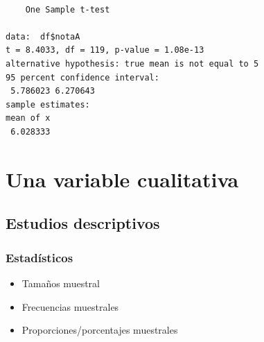 \documentclass[
  a4paper,
]{scrreport}
\newenvironment{Shaded}{\begin{snugshade}}{\end{snugshade}}
\newcommand{\AttributeTok}[1]{\textcolor[rgb]{0.40,0.45,0.13}{#1}}
\newcommand{\CommentTok}[1]{\textcolor[rgb]{0.37,0.37,0.37}{#1}}
\newcommand{\DecValTok}[1]{\textcolor[rgb]{0.68,0.00,0.00}{#1}}
\newcommand{\FunctionTok}[1]{\textcolor[rgb]{0.28,0.35,0.67}{#1}}
\newcommand{\NormalTok}[1]{\textcolor[rgb]{0.00,0.23,0.31}{#1}}
\newcommand{\SpecialCharTok}[1]{\textcolor[rgb]{0.37,0.37,0.37}{#1}}
\newcommand{\StringTok}[1]{\textcolor[rgb]{0.13,0.47,0.30}{#1}}
\providecommand{\tightlist}{%
  \setlength{\itemsep}{0pt}\setlength{\parskip}{0pt}}\usepackage{longtable,booktabs,array}
\theoremstyle{definition}
\theoremstyle{definition}
\theoremstyle{remark}
\begin{document}
\begin{Shaded}
\end{Shaded}

\begin{verbatim}

    One Sample t-test

data:  df$notaA
t = 8.4033, df = 119, p-value = 1.08e-13
alternative hypothesis: true mean is not equal to 5
95 percent confidence interval:
 5.786023 6.270643
sample estimates:
mean of x 
 6.028333 
\end{verbatim}

\hypertarget{una-variable-cualitativa}{%
\section{Una variable cualitativa}\label{una-variable-cualitativa}}

\hypertarget{estudios-descriptivos-1}{%
\subsection{Estudios descriptivos}\label{estudios-descriptivos-1}}

\hypertarget{estaduxedsticos-1}{%
\subsubsection{Estadísticos}\label{estaduxedsticos-1}}

\begin{itemize}
\tightlist
\item
  Tamaños muestral
\item
  Frecuencias muestrales
\item
  Proporciones/porcentajes muestrales
\end{itemize}

\begin{Shaded}
\end{Shaded}
\end{document}
